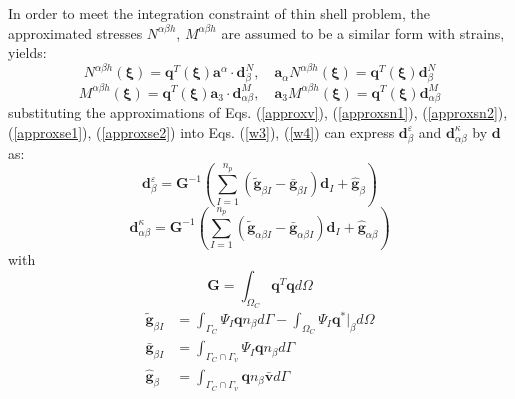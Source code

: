 In order to meet the integration constraint of thin shell problem, the approximated stresses $N^{\alpha\beta h}$, $M^{\alpha\beta h}$ are assumed to be a similar form with strains, yields:
\begin{equation}\label{approxse1}
N^{\alpha\beta h}(\boldsymbol \xi) = \boldsymbol q^T(\boldsymbol \xi) \boldsymbol a^\alpha \cdot \boldsymbol d_{\beta}^N,\quad
\boldsymbol a_\alpha N^{\alpha\beta h}(\boldsymbol \xi) = \boldsymbol q^T(\boldsymbol \xi) \boldsymbol d^N_\beta
\end{equation}
\begin{equation}\label{approxse2}
    M^{\alpha\beta h}(\boldsymbol \xi) = \boldsymbol q^T(\boldsymbol \xi) \boldsymbol a_3 \cdot \boldsymbol d_{\alpha\beta}^M,\quad
    \boldsymbol a_3 M^{\alpha\beta h}(\boldsymbol \xi) = \boldsymbol q^T(\boldsymbol \xi) \boldsymbol d_{\alpha\beta}^M
\end{equation}
substituting the approximations of Eqs. (\ref{approxv}), (\ref{approxsn1}), (\ref{approxsn2}), (\ref{approxse1}), (\ref{approxse2}) into Eqs. (\ref{w3}), (\ref{w4}) can express $\boldsymbol d^\varepsilon_\beta$ and $\boldsymbol d^\kappa_{\alpha\beta}$ by $\boldsymbol d$ as:
\begin{equation}\label{depsilon}
\boldsymbol d^\varepsilon_\beta = \boldsymbol G^{-1} \left (\sum_{I=1}^{n_p}(\tilde{\boldsymbol g}_{\beta I} - \bar{\boldsymbol g}_{\beta I}) \boldsymbol d_I + \hat{\boldsymbol g}_\beta \right )
\end{equation}
\begin{equation}\label{dkappa}
\boldsymbol d^\kappa_{\alpha\beta} = \boldsymbol G^{-1} \left (\sum_{I=1}^{n_p}(\tilde{\boldsymbol g}_{\alpha\beta I} - \bar{\boldsymbol g}_{\alpha\beta I})\boldsymbol d_I + \hat{\boldsymbol g}_{\alpha\beta} \right )
\end{equation}
with
\begin{equation}
\boldsymbol G = \int_{\Omega_C} \boldsymbol q^T \boldsymbol q d\Omega
\end{equation}
\begin{subequations}
\begin{align}
\tilde{\boldsymbol g}_{\beta I} &= \int_{\Gamma_C} \Psi_I \boldsymbol q n_\beta d\Gamma
- \int_{\Omega_C} \Psi_I \boldsymbol q^*\vert_\beta d\Omega \\
\bar{\boldsymbol g}_{\beta I} &= \int_{\Gamma_C\cap\Gamma_v} \Psi_I \boldsymbol q n_\beta d\Gamma \\
\hat{\boldsymbol g}_{\beta} &= \int_{\Gamma_C\cap\Gamma_v} \boldsymbol q n_\beta \bar{\boldsymbol v} d\Gamma 
\end{align}
\end{subequations}
